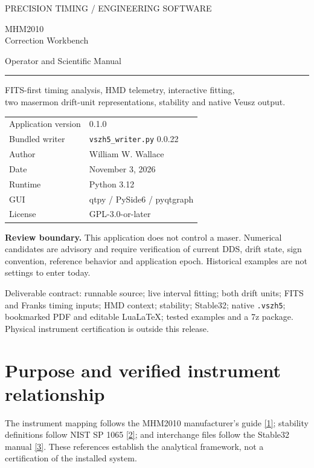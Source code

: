 \documentclass[11pt,a4paper]{article}
\newcommand{\manual}{\href{https://www.gb.nrao.edu/~fghigo/timer/MSMmaser/Maser_UG_75666-201_Rev_J.PDF}{[1]}}
\newcommand{\nist}{\href{https://tf.nist.gov/general/pdf/2220.pdf}{[2]}}
\newcommand{\stablemanual}{\href{http://www.stable32.com/Manual154.pdf}{[3]}}
\newcommand{\warning}[1]{\par\noindent\colorbox{light}{\parbox{\dimexpr\linewidth-2\fboxsep}{\textbf{Review boundary.} #1}}\par}
\begin{document}
\begin{titlepage}
{\sffamily\color{teal}\large PRECISION TIMING / ENGINEERING SOFTWARE\par}
\vspace{18mm}
{\sffamily\color{navy}\Huge MHM2010\\Correction Workbench\par}
\vspace{5mm}
{\sffamily\Large Operator and Scientific Manual\par}
\vspace{9mm}
\rule{\linewidth}{1pt}
\vspace{5mm}
{\large FITS-first timing analysis, HMD telemetry, interactive fitting,\\
two masermon drift-unit representations, stability and native Veusz output.\par}
\vspace{12mm}
\begin{tabular}{@{}ll@{}}
Application version & 0.1.0\\
Bundled writer & \texttt{vszh5\_writer.py} 0.0.22\\
Author & William W. Wallace\\
Date & November 3, 2026\\
Runtime & Python 3.12\\
GUI & qtpy / PySide6 / pyqtgraph\\
License & GPL-3.0-or-later\\
\end{tabular}
\vfill
\warning{This application does not control a maser. Numerical candidates are
advisory and require verification of current DDS, drift state, sign convention,
reference behavior and application epoch. Historical examples are not settings
to enter today.}
\vspace{5mm}
{\small Deliverable contract: runnable source; live interval fitting; both drift
units; FITS and Franks timing inputs; HMD context; stability; Stable32; native
\texttt{.vszh5}; bookmarked PDF and editable LuaLaTeX; tested examples and a 7z package.
Physical instrument certification is outside this release.}
\end{titlepage}
\tableofcontents
\clearpage

\section{Purpose and verified instrument relationship}
The instrument mapping follows the MHM2010 manufacturer's guide \manual;
stability definitions follow NIST SP 1065 \nist; and interchange files follow
the Stable32 manual \stablemanual. These references establish the analytical
framework, not a certification of the installed system.
\end{document}
